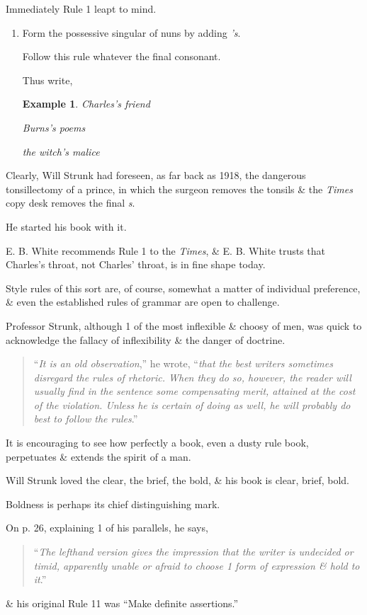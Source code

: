 \documentclass{article}
\newtheorem{example}{Example}
\begin{document}
Immediately Rule 1 leapt to mind.
\begin{enumerate}
	\item Form the possessive singular of nuns by adding {\it 's}.
	
	Follow this rule whatever the final consonant.
	
	Thus write,
	\begin{example}
		Charles's friend
		
		Burns's poems
		
		the witch's malice
	\end{example}
\end{enumerate}
Clearly, Will Strunk had foreseen, as far back as 1918, the dangerous tonsillectomy of a prince, in which the surgeon removes the tonsils \& the {\it Times} copy desk removes the final {\it s}.

He started his book with it.

E. B. White recommends Rule 1 to the {\it Times}, \& E. B. White trusts that Charles's throat, not Charles' throat, is in fine shape today.

%
Style rules of this sort are, of course, somewhat a matter of individual preference, \& even the established rules of grammar are open to challenge.

Professor Strunk, although 1 of the most inflexible \& choosy of men, was quick to acknowledge the fallacy of inflexibility \& the danger of doctrine.
\begin{quotation}
	``{\it It is an old observation},'' he wrote, ``{\it that the best writers sometimes disregard the rules of rhetoric. When they do so, however, the reader will usually find in the sentence some compensating merit, attained at the cost of the violation. Unless he is certain of doing as well, he will probably do best to follow the rules}.''
\end{quotation}
It is encouraging to see how perfectly a book, even a dusty rule book, perpetuates \& extends the spirit of a man.

Will Strunk loved the clear, the brief, the bold, \& his book is clear, brief, bold.

Boldness is perhaps its chief distinguishing mark.

On p. 26, explaining 1 of his parallels, he says,
\begin{quotation}
	``{\it The lefthand version gives the impression that the writer is undecided or timid, apparently unable or afraid to choose 1 form of expression \& hold to it}.''
\end{quotation}
\& his original Rule 11 was ``Make definite assertions.''
\end{document}
